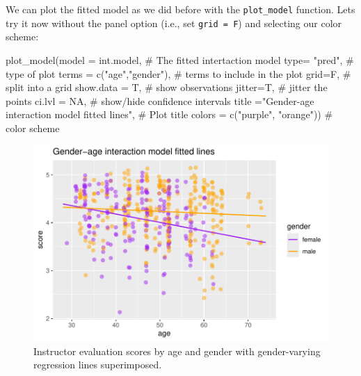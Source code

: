 \documentclass[
  letterpaper,
  DIV=11,
  numbers=noendperiod]{scrartcl}
\newenvironment{Shaded}{\begin{snugshade}}{\end{snugshade}}
\newcommand{\AttributeTok}[1]{\textcolor[rgb]{0.40,0.45,0.13}{#1}}
\newcommand{\CommentTok}[1]{\textcolor[rgb]{0.37,0.37,0.37}{#1}}
\newcommand{\ConstantTok}[1]{\textcolor[rgb]{0.56,0.35,0.01}{#1}}
\newcommand{\FunctionTok}[1]{\textcolor[rgb]{0.28,0.35,0.67}{#1}}
\newcommand{\NormalTok}[1]{\textcolor[rgb]{0.00,0.23,0.31}{#1}}
\newcommand{\StringTok}[1]{\textcolor[rgb]{0.13,0.47,0.30}{#1}}
\begin{document}
We can plot the fitted model as we did before with the
\texttt{plot\_model} function. Lets try it now without the panel option
(i.e., set \texttt{grid\ =\ F}) and selecting our color scheme:

\begin{Shaded}
\begin{Highlighting}[]
\FunctionTok{plot\_model}\NormalTok{(}\AttributeTok{model =}\NormalTok{ int.model,         }\CommentTok{\# The fitted intertaction model}
           \AttributeTok{type=}  \StringTok{"pred"}\NormalTok{,              }\CommentTok{\# type of plot}
           \AttributeTok{terms =} \FunctionTok{c}\NormalTok{(}\StringTok{"age"}\NormalTok{,}\StringTok{"gender"}\NormalTok{), }\CommentTok{\# terms to include in the plot}
           \AttributeTok{grid=}\NormalTok{F,                    }\CommentTok{\# split into a grid}
           \AttributeTok{show.data =}\NormalTok{ T,             }\CommentTok{\# show observations}
           \AttributeTok{jitter=}\NormalTok{T,                  }\CommentTok{\# jitter the points}
           \AttributeTok{ci.lvl =} \ConstantTok{NA}\NormalTok{,               }\CommentTok{\# show/hide confidence intervals}
           \AttributeTok{title =}\StringTok{"Gender{-}age interaction model fitted lines"}\NormalTok{, }\CommentTok{\# Plot title}
           \AttributeTok{colors =} \FunctionTok{c}\NormalTok{(}\StringTok{"purple"}\NormalTok{, }\StringTok{"orange"}\NormalTok{)) }\CommentTok{\# color scheme}
\end{Highlighting}
\end{Shaded}

\begin{figure}[H]

{\centering \includegraphics{notes_files/figure-pdf/unnamed-chunk-9-1.pdf}

}

\caption{Instructor evaluation scores by age and gender with
gender-varying regression lines superimposed.}

\end{figure}%
\end{document}
